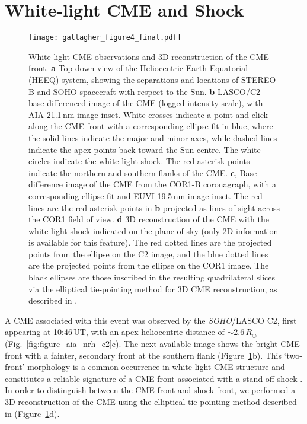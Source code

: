 \section{White-light CME and Shock}
\begin{figure}[!t]
\begin{center}
\texttt{[image: gallagher\_figure4\_final.pdf]}
\caption[3D reconstruction of CME and white-light shock]{White-light CME observations and 3D reconstruction of the CME front. {\bf a} Top-down view of the Heliocentric Earth Equatorial (HEEQ) system, showing the separations and locations of STEREO-B and SOHO spacecraft with respect to the Sun. {\bf b} LASCO/C2 base-differenced image of the CME (logged intensity scale), with AIA 21.1\,nm image inset. White crosses indicate a point-and-click along the CME front with a corresponding ellipse fit in blue, where the solid lines indicate the major and minor axes, while dashed lines indicate the apex points back toward the Sun centre. The white circles indicate the white-light shock. The red asterisk points indicate the northern and southern flanks of the CME. {\bf c}, Base difference image of the CME from the COR1-B coronagraph, with a corresponding ellipse fit and EUVI 19.5\,nm image inset. The red lines are the red asterisk points in {\bf b} projected as lines-of-sight across the COR1 field of view. {\bf d} 3D reconstruction of the CME with the white light shock indicated on the plane of sky (only 2D information is available for this feature). The red dotted lines are the projected points from the ellipse on the C2 image, and the blue dotted lines are the projected points from the ellipse on the COR1 image. The black ellipses are those inscribed in the resulting quadrilateral slices via the elliptical tie-pointing method for 3D CME reconstruction, as described in \citep{byrne2010}.}
\label{fig:3d_cme}
\end{center}
\end{figure}
A CME associated with this event was observed by the \emph{SOHO}/LASCO C2, first appearing at 10:46\,UT, with an apex heliocentric distance of $\sim$2.6\,$R_{\odot}$ (Fig.~\ref{fig:figure_aia_nrh_c2}c). The next available image shows the bright CME front with a fainter, secondary front at the southern flank (Figure~\ref{fig:3d_cme}b). This `two-front' morphology is a common occurrence in white-light CME structure and constitutes a reliable signature of a CME front associated with a stand-off shock \citep{vourlidas2012}. In order to distinguish between the CME front and shock front, we performed a 3D reconstruction of the CME using the elliptical tie-pointing method described in \cite{byrne2010} (Figure~\ref{fig:3d_cme}d). 

